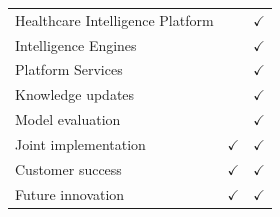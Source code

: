 \begin{longtable}{|p{7cm}|c|c|}
&

\\

\hline

Healthcare Intelligence Platform

&

&

$\checkmark$

\\

\hline

Intelligence Engines

&

&

$\checkmark$

\\

\hline

Platform Services

&

&

$\checkmark$

\\

\hline

Knowledge updates

&

&

$\checkmark$

\\

\hline

Model evaluation

&

&

$\checkmark$

\\

\hline

Joint implementation

&

$\checkmark$

&

$\checkmark$

\\

\hline

Customer success

&

$\checkmark$

&

$\checkmark$

\\

\hline

Future innovation

&

$\checkmark$

&

$\checkmark$

\\

\hline

\end{longtable}


